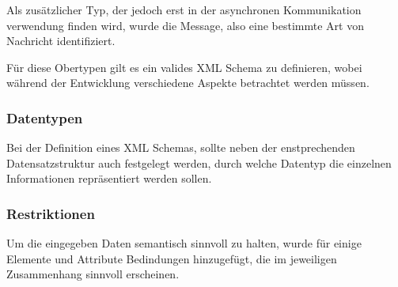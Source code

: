 \documentclass[a4paper]{article}
\begin{document}
Als zusätzlicher Typ, der jedoch erst in der asynchronen Kommunikation verwendung finden wird, wurde die Message, also eine bestimmte Art von Nachricht identifiziert.

Für diese Obertypen gilt es ein valides XML Schema zu definieren, wobei während der Entwicklung verschiedene Aspekte betrachtet werden müssen.  

\newpage

\subsubsection{Datentypen}
Bei der Definition eines XML Schemas, sollte neben der enstprechenden Datensatzstruktur auch festgelegt werden, durch welche Datentyp die einzelnen Informationen repräsentiert werden sollen.

\newpage

\subsubsection{Restriktionen}
Um die eingegeben Daten semantisch sinnvoll zu halten, wurde für einige Elemente und Attribute Bedindungen hinzugefügt, die im jeweiligen Zusammenhang sinnvoll erscheinen. 
\end{document}
